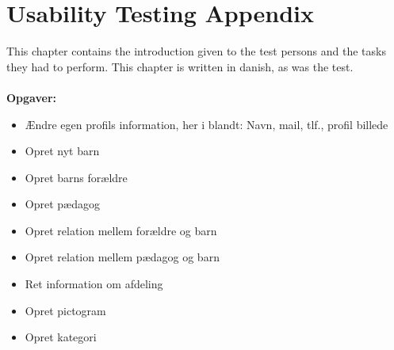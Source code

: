 \chapter{Usability Testing Appendix}
\label{usabilityTestingAppendix}
This chapter contains the introduction given to the test persons and the tasks they had to perform. This chapter is written in danish, as was the test.\\
\\
\textbf{Opgaver:}\\

\begin{itemize}
	\item Ændre egen profils information, her i blandt: Navn, mail, tlf., profil billede
	\item	Opret nyt barn
	\item	Opret barns forældre
	\item	Opret pædagog
	\item	Opret relation mellem forældre og barn
	\item	Opret relation mellem pædagog og barn
	\item	Ret information om afdeling
	\item	Opret pictogram
	\item	Opret kategori
\end{itemize}

